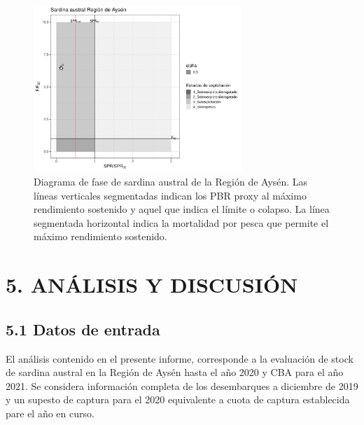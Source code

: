 \documentclass[
  spanish,
]{article}
\begin{document}
\begin{figure}[h!]
\centering
\includegraphics[width=0.7\textwidth]{LBPA/Figuras/Fig_DiagramaFaseXI-1.pdf}
\caption{Diagrama de fase de sardina austral de la Región de Aysén. Las líneas verticales segmentadas indican los PBR proxy al máximo rendimiento sostenido y aquel que indica el límite o colapso. La línea segmentada horizontal indica la mortalidad por pesca que permite el máximo rendimiento sostenido.}
\label{Fig26}
\end{figure}

\pagebreak

\hypertarget{anuxe1lisis-y-discusiuxf3n}{%
\section{5. ANÁLISIS Y DISCUSIÓN}\label{anuxe1lisis-y-discusiuxf3n}}

\hypertarget{datos-de-entrada}{%
\subsection{5.1 Datos de entrada}\label{datos-de-entrada}}

El análisis contenido en el presente informe, corresponde a la
evaluación de stock de sardina austral en la Región de Aysén hasta el
año 2020 y CBA para el año 2021. Se considera información completa de
los desembarques a diciembre de 2019 y un supesto de captura para el
2020 equivalente a cuota de captura establecida pare el año en curso.
\end{document}
